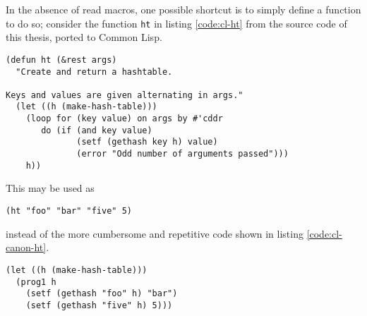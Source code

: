 \documentclass[a4paper,10pt,twoside]{article}
\newcommand{\cl}{Common Lisp}
\newcommand{\fun}[1]{\texttt{#1}}
\begin{document}
In the absence of read macros, one possible shortcut is to simply define a
function to do so; consider the function \fun{ht} in listing \ref{code:cl-ht}
from the source code of this thesis, ported to \cl{}.



\begin{lstlisting}[style=lispcode,caption={Creating a hash
  table.},label={code:cl-ht}]
(defun ht (&rest args)
  "Create and return a hashtable.

Keys and values are given alternating in args."
  (let ((h (make-hash-table)))
    (loop for (key value) on args by #'cddr
       do (if (and key value)
              (setf (gethash key h) value)
              (error "Odd number of arguments passed")))
    h))
\end{lstlisting}
This may be used as


\begin{lstlisting}[style=lispinline]
(ht "foo" "bar" "five" 5)
\end{lstlisting}


instead of the more cumbersome and repetitive code shown in listing
\ref{code:cl-canon-ht}.


\begin{lstlisting}[style=lispcode,caption={Canonical way to create a hash
  table.},label={code:cl-canon-ht}]
(let ((h (make-hash-table)))
  (prog1 h
    (setf (gethash "foo" h) "bar")
    (setf (gethash "five" h) 5)))
\end{lstlisting}
\end{document}

